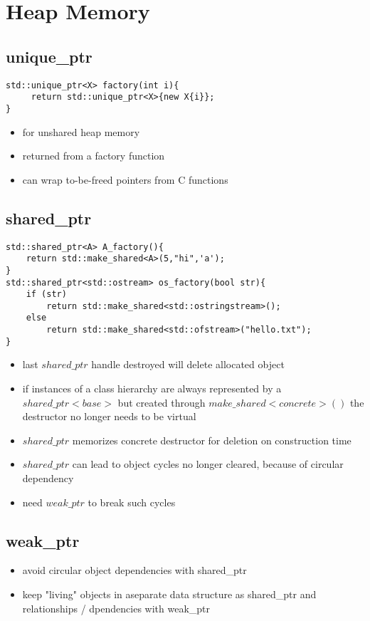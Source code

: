 \section{Heap Memory}
\subsection{unique\_ptr}
\begin{lstlisting}
std::unique_ptr<X> factory(int i){
	 return std::unique_ptr<X>{new X{i}};
}
\end{lstlisting}
\begin{itemize}
	\item for unshared heap memory
	\item returned from a factory function
	\item can wrap to-be-freed pointers from C functions
\end{itemize}

\subsection{shared\_ptr}
\begin{lstlisting}
std::shared_ptr<A> A_factory(){
	return std::make_shared<A>(5,"hi",'a');
}
std::shared_ptr<std::ostream> os_factory(bool str){
	if (str)
		return std::make_shared<std::ostringstream>();
	else
		return std::make_shared<std::ofstream>("hello.txt");
}
\end{lstlisting}
\begin{itemize}
\item last $shared\_ptr$ handle destroyed will delete
allocated object
\item if instances of a class hierarchy are always
represented by a $shared\_ptr<base>$ but created
through $make\_shared<concrete>()$ the
destructor no longer needs to be virtual
\item $shared\_ptr$ memorizes concrete destructor for
deletion on construction time
\item $shared\_ptr$ can lead to object cycles no longer
cleared, because of circular dependency
\item need $weak\_ptr$ to break such cycles
\end{itemize}

\subsection{weak\_ptr}
\begin{itemize}
	\item avoid circular object dependencies with shared\_ptr
	\item keep "living" objects in aseparate data structure as shared\_ptr and relationships / dpendencies with weak\_ptr
\end{itemize}

